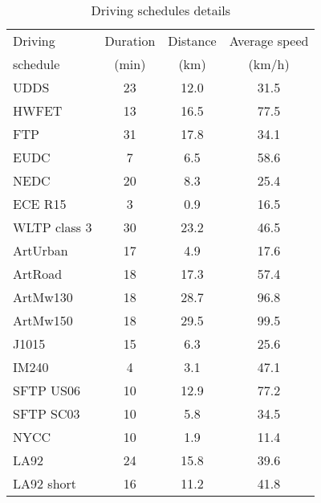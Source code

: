 \documentclass[conference,letterpaper]{IEEEtran}
\begin{document}
\begin{table}
	\centering
	\caption{Driving schedules details}\label{tab:driv_sched}\label{tab:cycles}
	\begin{tabular}{lccc}
		\toprule
		Driving    &  Duration   & Distance  & Average speed    \\
		schedule   &  (\si{\minute}) & (\si{\kilo\metre}) & (\si[per-mode=symbol]{\kilo\metre\per\hour}) \\ \midrule
		UDDS	&	23	&	12.0	&	31.5\\
		HWFET	&	13	&	16.5	&	77.5\\
		FTP	&	31	&	17.8	&	34.1\\
		EUDC	&	7	&	6.5	&	58.6\\
		NEDC	&	20	&	8.3	&	25.4\\
		ECE R15	&	3	&	0.9	&	16.5\\
		WLTP class 3	&	30	&	23.2	&	46.5\\
		ArtUrban	&	17	&	4.9	&	17.6\\
		ArtRoad	&	18	&	17.3	&	57.4\\
		ArtMw130	&	18	&	28.7	&	96.8\\
		ArtMw150	&	18	&	29.5	&	99.5\\
		J1015	&	15	&	6.3	&	25.6\\
		IM240	&	4	&	3.1	&	47.1\\
		SFTP US06	&	10	&	12.9	&	77.2\\
		SFTP SC03	&	10	&	5.8	&	34.5\\
		NYCC	&	10	&	1.9	&	11.4\\
		LA92	&	24	&	15.8	&	39.6\\
		LA92 short	&	16	&	11.2	&	41.8\\
		\bottomrule
	\end{tabular}
\end{table}







\end{document}
